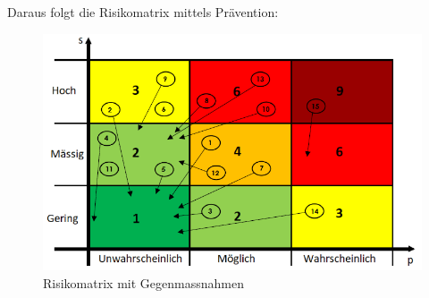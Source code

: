 \documentclass[10pt,a4paper,oneside]{99_fhnwreport}
\begin{document}
Daraus folgt die Risikomatrix mittels Prävention:

\begin{figure}[htbp]
	\centering
	\includegraphics[width=13.5cm]{risiko2.png}
		\caption{Risikomatrix mit Gegenmassnahmen}
\end{figure}
\end{document}
